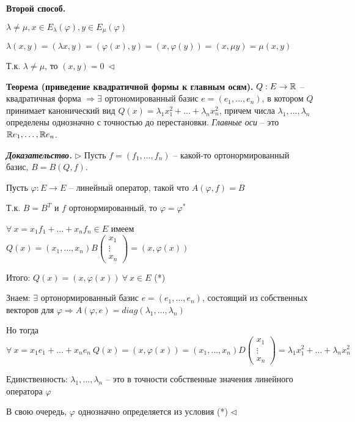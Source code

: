 \bigskip
\textbf{Второй способ.}

$\lambda \neq \mu, x \in E_{\lambda} (\varphi), y \in E_{\mu} (\varphi)$

$\lambda(x, y) = (\lambda x, y) = (\varphi(x), y) = (x, \varphi(y)) = (x, \mu y) = \mu (x, y)$

Т.к. $\lambda \neq \mu$, то $(x, y) = 0 \ \lhd$

\bigskip
\textbf{Теорема (приведение квадратичной формы к главным осям).} $Q: E \rightarrow \mathbb{R}$ -- квадратичная форма $\Rightarrow \exists$ ортономированный базис $e = (e_1, \dots, e_n)$, в котором $Q$ принимает канонический вид $Q(x) = \lambda_1 x_1^2 + \dots + \lambda_n x_n^2$, причем числа $\lambda_1, \dots, \lambda_n$ определены однозначно с точностью до перестановки. \textit{Главные оси} -- это $\mathbb{R} e_1, \dots, \mathbb{R} e_n$.

\bigskip
\textbf{\textit{Доказательство.}} $\rhd$ Пусть $f = (f_1, \dots, f_n)$ -- какой-то ортонормированный базис, $B = B(Q, f)$.

Пусть $\varphi: E \rightarrow E$ -- линейный оператор, такой что $A(\varphi, f) = B$

Т.к. $B = B^T$ и $f$ ортонормированный, то $\varphi = \varphi^*$

$\forall \ x = x_1 f_1 + \dots + x_n f_n \in E$ имеем $Q(x) = (x_1, \dots, x_n) B \begin{pmatrix} x_1 \\ \vdots \\ x_n \end{pmatrix} = (x, \varphi(x))$

Итого: $Q(x) = (x, \varphi(x)) \ \forall \ x \in E$ (*)

\bigskip
Знаем: $\exists$ ортонормированный базис $e= (e_1, \dots, e_n)$, состоящий из собственных векторов для $\varphi \Rightarrow A(\varphi, e) = diag (\lambda_1, \dots, \lambda_n)$

Но тогда $\forall \ x = x_1 e_1 + \dots + x_n e_n \ Q(x) = (x, \varphi(x)) = (x_1, \dots, x_n) D \begin{pmatrix}
x_1 \\ \vdots \\ x_n \end{pmatrix} = \lambda_1 x_1^2 + \dots + \lambda_n x_n^2$

\bigskip
Единственность: $\lambda_1, \dots, \lambda_n$ -- это в точности собственные значения линейного оператора $\varphi$

В свою очередь, $\varphi$ однозначно определяется из условия (*) $\lhd$

